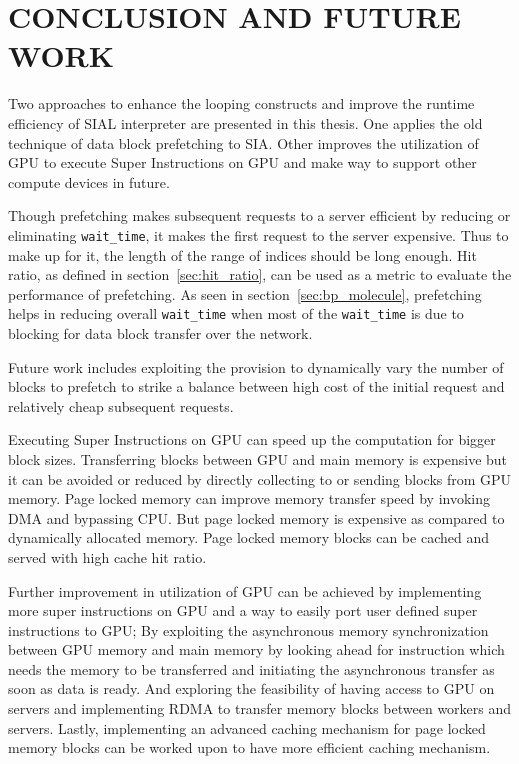 \chapter{CONCLUSION AND FUTURE WORK}\label{conclusion}
Two approaches to enhance the looping constructs and improve the runtime efficiency
of SIAL interpreter are presented in this thesis. One applies the old technique of
data block prefetching to SIA. Other improves
the utilization of GPU to execute Super Instructions on GPU and make way to support
other compute devices in future.

Though prefetching makes subsequent requests to a server efficient by reducing or
eliminating \texttt{wait\_time}, it makes the first request to the server expensive.
Thus to make up for it, the length of the range of indices should be long enough. Hit
ratio, as defined in section~\ref{sec:hit_ratio}, can be used as a metric to evaluate
the performance of prefetching. As seen in section~\ref{sec:bp_molecule}, prefetching
helps in reducing overall \texttt{wait\_time} when most of the \texttt{wait\_time}
is due to blocking for data block transfer over the network.

Future work includes exploiting the provision to dynamically vary the number of blocks
to prefetch to strike a balance between high cost of the initial request and relatively
cheap subsequent requests.

Executing Super Instructions on GPU can speed up the computation for bigger block
sizes. Transferring blocks between GPU and main memory is expensive but it can be
avoided or reduced by directly collecting to or sending blocks from GPU memory.
Page locked memory
can improve memory transfer speed by invoking DMA and bypassing CPU. But page locked
memory is expensive as compared to dynamically allocated memory. Page locked
memory blocks can be cached and served with high cache hit ratio.

Further improvement in utilization of GPU can be achieved by implementing more
super instructions on GPU and a way to easily port user defined super instructions
to GPU; By exploiting the asynchronous memory synchronization between GPU memory
and main memory by looking ahead for instruction which needs the memory
to be transferred and initiating the asynchronous transfer as soon as data is ready.
And exploring the feasibility of having access to GPU on servers and implementing
RDMA to transfer memory blocks between workers and servers. Lastly, implementing
an advanced caching mechanism for page locked memory blocks can be worked upon to have
more efficient caching mechanism.
